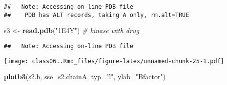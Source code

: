 \documentclass[]{article}
\newenvironment{Shaded}{\begin{snugshade}}{\end{snugshade}}
\newcommand{\CommentTok}[1]{\textcolor[rgb]{0.56,0.35,0.01}{\textit{#1}}}
\newcommand{\DataTypeTok}[1]{\textcolor[rgb]{0.13,0.29,0.53}{#1}}
\newcommand{\KeywordTok}[1]{\textcolor[rgb]{0.13,0.29,0.53}{\textbf{#1}}}
\newcommand{\NormalTok}[1]{#1}
\newcommand{\OperatorTok}[1]{\textcolor[rgb]{0.81,0.36,0.00}{\textbf{#1}}}
\newcommand{\StringTok}[1]{\textcolor[rgb]{0.31,0.60,0.02}{#1}}
\begin{document}
\begin{verbatim}
##   Note: Accessing on-line PDB file
##    PDB has ALT records, taking A only, rm.alt=TRUE
\end{verbatim}

\begin{Shaded}
\begin{Highlighting}[]
\NormalTok{s3 <-}\StringTok{ }\KeywordTok{read.pdb}\NormalTok{(}\StringTok{"1E4Y"}\NormalTok{) }\CommentTok{# kinase with drug}
\end{Highlighting}
\end{Shaded}

\begin{verbatim}
##   Note: Accessing on-line PDB file
\end{verbatim}

\begin{Shaded}
\end{Shaded}

\texttt{[image: class06..Rmd\_files/figure-latex/unnamed-chunk-25-1.pdf]}

\begin{Shaded}
\begin{Highlighting}[]
\KeywordTok{plotb3}\NormalTok{(s2.b, }\DataTypeTok{sse=}\NormalTok{s2.chainA, }\DataTypeTok{typ=}\StringTok{"l"}\NormalTok{, }\DataTypeTok{ylab=}\StringTok{"Bfactor"}\NormalTok{)}
\end{Highlighting}
\end{Shaded}
\end{document}
